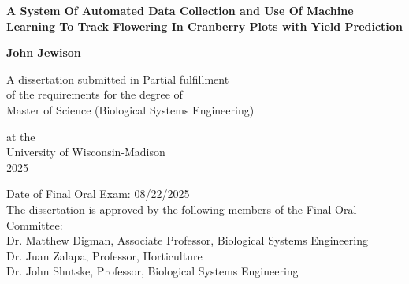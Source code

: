 \begin{titlepage}
    \begin{center}
        \vspace*{1cm}
        
        \Huge
        \textbf{A System Of Automated Data Collection and Use Of Machine Learning To Track Flowering In Cranberry Plots with Yield Prediction }
        
        \vspace{0.5cm}
        \LARGE
        \vspace{0.5cm}
    
        \textbf{John Jewison}
        
        \vfill
        
        A dissertation submitted in Partial fulfillment\\
        of the requirements for the degree of\\
        Master of Science
        (Biological Systems Engineering)\\
        
    
        
        \vspace{1.8cm}

        
        \Large
        at the\\University of Wisconsin-Madison\\
        2025\\
        \vspace{1.0cm}
        \begin{flushleft}
        \large
        Date of Final Oral Exam:  08/22/2025\\
        \vspace{1.0cm}
        The dissertation is approved by the following members of the Final Oral Committee: \\
        \vspace{.5cm}
        \setlength{\parindent}{6ex}
        Dr. Matthew Digman, Associate Professor, Biological Systems Engineering\\
        Dr. Juan Zalapa,   Professor, Horticulture\\ 
        Dr. John Shutske, Professor, Biological Systems Engineering\\
        \end{flushleft}
        
    \end{center}
    
\end{titlepage}
